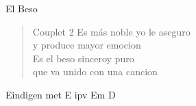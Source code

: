 \begin{song}{El Beso}

\begin{verse}{Couplet 2}
Es más noble yo le aseguro\\
y produce mayor emocion\\
Es el beso sinceroy puro\\
que va unido con una cancion\\
\end{verse}

Eindigen met E ipv Em D
\end{song}